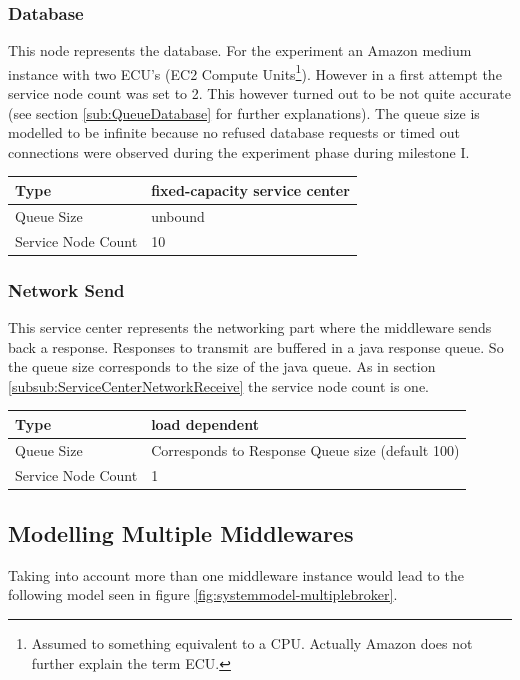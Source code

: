 \documentclass[a4paper]{article}
\begin{document}
\subsubsection{Database}
This node represents the database. For the experiment an Amazon medium instance with two ECU's (EC2 Compute Units\footnote{Assumed to something equivalent to a CPU. Actually Amazon does not further explain the term ECU.}). However in a first attempt the service node count was set to 2. This however turned out to be not quite accurate (see section \ref{sub:QueueDatabase} for further explanations).  The queue size is modelled to be infinite because no refused database requests or timed out connections were observed during the experiment phase during milestone I. \\

\begin{tabular}{|l|l|}
\hline 
Type & fixed-capacity service center \\ 
\hline 
Queue Size & unbound \\ 
\hline 
Service Node Count & 10 \\ 
\hline 
\end{tabular} 


\subsubsection{Network Send}
This service center represents the networking part where the middleware sends back a response. Responses to transmit are buffered in a java response queue. So the queue size corresponds to the size of the java queue. As in section  \ref{subsub:ServiceCenterNetworkReceive} the service node count is one. \\

\begin{tabular}{|l|l|}
\hline 
Type & load dependent \\ 
\hline 
Queue Size & Corresponds to Response Queue size (default 100)\\ 
\hline 
Service Node Count & 1 \\ 
\hline 
\end{tabular} 

\subsection{Modelling Multiple Middlewares}
Taking into account more than one middleware instance would lead to the following model seen in figure \ref{fig:systemmodel-multiplebroker}.
\end{document}
